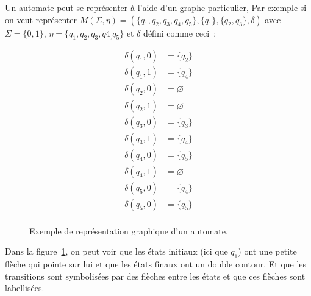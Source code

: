 \documentclass[12pt]{article}
\begin{document}
Un automate peut se représenter à l'aide d'un graphe particulier, Par exemple
si on veut représenter \(M(\Sigma, \eta) = (\{q_1, q_2, q_3, q_4, q_5\},
\{q_1\},\{q_2, q_3\}, \delta)\) avec \(\Sigma = \{0, 1\}\), \(\eta = \{q_1,
q_2, q_3, q4_, q_5\}\) et \(\delta\) défini comme ceci~:

\begin{align*}
    \delta(q_1, 0) & = \{q_2\}     \\
    \delta(q_1, 1) & = \{q_4\}     \\
    \delta(q_2, 0) & = \varnothing \\
    \delta(q_2, 1) & = \varnothing \\
    \delta(q_3, 0) & = \{q_3\}     \\
    \delta(q_3, 1) & = \{q_4\}     \\
    \delta(q_4, 0) & = \{q_5\}     \\
    \delta(q_4, 1) & = \varnothing \\
    \delta(q_5, 0) & = \{q_4\}     \\
    \delta(q_5, 0) & = \{q_5\}     \\
\end{align*}

\begin{figure}[H]
    \centering
    \caption{
        Exemple de représentation graphique d'un automate.
    }\label{fig:automata}
\end{figure}

Dans la figure~\ref{fig:automata}, on peut voir que les états initiaux (ici que
\(q_1\)) ont une petite flèche qui pointe sur lui et que les états finaux ont
un double contour. Et que les transitions sont symbolisées par des flèches
entre les états et que ces flèches sont labellisées.
\end{document}
